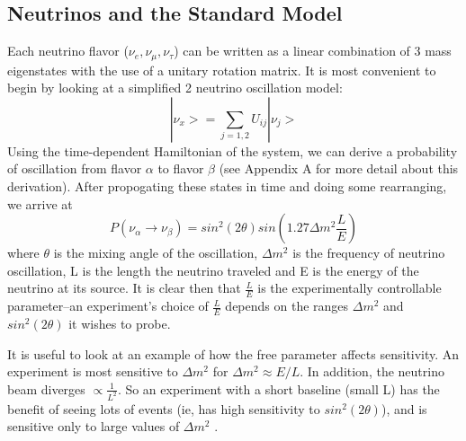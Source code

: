 \documentclass[12pt]{article}
\begin{document}
\subsection{Neutrinos and the Standard Model}
\par Each neutrino flavor ($\nu_e, \nu_\mu, \nu_\tau$) can be written as a linear combination of 3 mass eigenstates with the use of a unitary rotation matrix. It is most convenient to begin by looking at a simplified 2 neutrino oscillation model:
\begin{equation} \label{eq:eig}
|\nu_x> = \sum_{j=1,2} U_{ij} |\nu_j>  
\end{equation}
Using the time-dependent Hamiltonian of the system, we can derive a probability of oscillation from flavor $\alpha$ to flavor $\beta$ (see Appendix A for more detail about this derivation).  After propogating these states in time and doing some rearranging, we arrive at 
\begin{equation} \label{eq:prob}
P(\nu_\alpha \rightarrow \nu_\beta) = sin^2(2\theta)sin(1.27\Delta m^2  \frac{L}{E})
\end{equation}
where $\theta$ is the mixing angle of the oscillation, $\Delta m^2$ is the frequency of neutrino oscillation, L is the length the neutrino traveled and E is the energy of the neutrino at its source.  It is clear then that $\frac{L}{E}$ is the experimentally controllable parameter--an experiment's choice of $\frac{L}{E}$ depends on the ranges $\Delta m^2$ and $sin^2(2\theta)$ it wishes to probe. 
\par It is useful to look at an example of how the free parameter affects sensitivity.  An experiment is most sensitive to $\Delta m^2$ for $\Delta m^2 \approx E/L$.  In addition, the neutrino beam diverges $\propto \frac{1}{L^2}$.  So an experiment with a short baseline (small L) has the benefit of seeing lots of events (ie, has high sensitivity to $sin^2(2\theta)$), and is sensitive only to large values of $\Delta m^2$ \cite{warwick}. 
\end{document}
